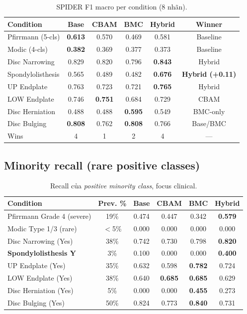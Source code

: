 \documentclass[11pt,a4paper]{article}
\newcommand{\best}[1]{\textbf{#1}}
\begin{document}
\begin{table}[h]
\centering
\caption{SPIDER F1 macro per condition (8 nhãn).}
\small
\begin{tabular}{@{}lcccc|c@{}}
\toprule
\rowcolor{tablehdr}
Condition & Base & CBAM & BMC & Hybrid & Winner \\
\midrule
Pfirrmann (5-cls)    & \best{0.613} & 0.570 & 0.469 & 0.581         & Baseline \\
Modic (4-cls)        & \best{0.382} & 0.369 & 0.377 & 0.373         & Baseline \\
Disc Narrowing       & 0.829        & 0.820 & 0.796 & \best{0.843}  & Hybrid \\
Spondylolisthesis    & 0.565        & 0.489 & 0.482 & \best{0.676}  & \textbf{Hybrid (+0.11)} \\
UP Endplate          & 0.763        & 0.723 & 0.721 & \best{0.765}  & Hybrid \\
LOW Endplate         & 0.746        & \best{0.751} & 0.684 & 0.729  & CBAM \\
Disc Herniation      & 0.488        & 0.488 & \best{0.595} & 0.549  & BMC-only \\
Disc Bulging         & \best{0.808} & 0.762 & \best{0.808} & 0.766  & Base/BMC \\
\midrule
Wins                 & 4 & 1 & 2 & 4 & --- \\
\bottomrule
\end{tabular}
\end{table}

\subsection*{Minority recall (rare positive classes)}

\begin{table}[h]
\centering
\caption{Recall của \emph{positive minority class}, focus clinical.}
\small
\begin{tabular}{@{}lccccc@{}}
\toprule
\rowcolor{tablehdr}
Condition & Prev. \% & Base & CBAM & BMC & Hybrid \\
\midrule
Pfirrmann Grade 4 (severe)   & 19\% & 0.474 & 0.447 & 0.342 & \best{0.579} \\
Modic Type 1/3 (rare)        & $<$5\%& 0.000 & 0.000 & 0.000 & 0.000 \\
Disc Narrowing (Yes)         & 38\% & 0.742 & 0.730 & 0.798 & \best{0.820} \\
\textbf{Spondylolisthesis Y} & 3\% & 0.100 & 0.000 & 0.000 & \best{0.400} \\
UP Endplate (Yes)            & 35\% & 0.632 & 0.598 & \best{0.782} & 0.724 \\
LOW Endplate (Yes)           & 38\% & 0.640 & \best{0.685} & \best{0.685} & 0.629 \\
Disc Herniation (Yes)        & 5\% & 0.000 & 0.000 & \best{0.455} & 0.273 \\
Disc Bulging (Yes)           & 50\% & 0.824 & 0.773 & \best{0.840} & 0.731 \\
\bottomrule
\end{tabular}
\end{table}
\end{document}
